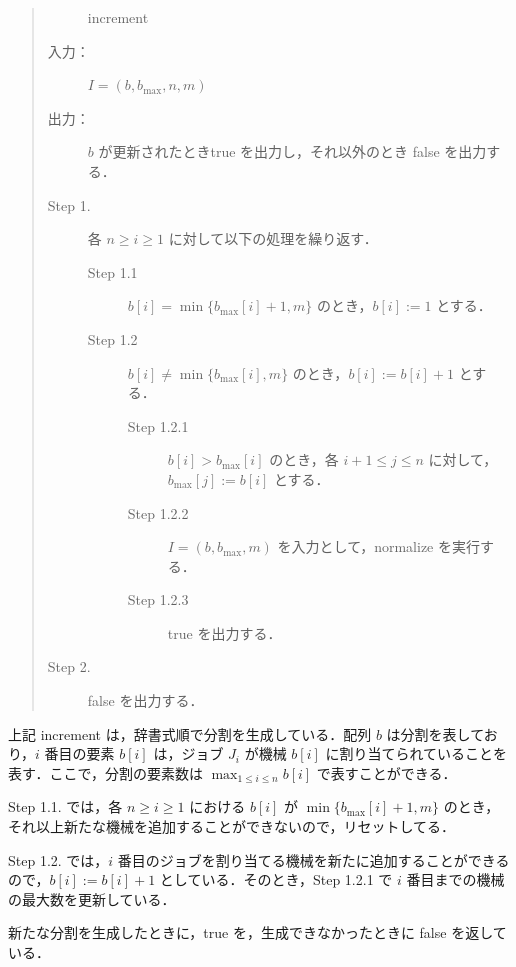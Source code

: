 \documentclass[12pt]{optlab-bachelor}
\begin{document}
\begin{quote}
  \begin{description}
    \item[]  {\sc increment}
    \item[入力：] $I = (b,b_{\max},n, m)$
    \item[出力：] $b$ が更新されたとき{\sc true} を出力し，それ以外のとき {\sc false} を出力する．
  \end{description}
  \begin{description}
    \item[Step 1.] 各 $n \ge i \ge 1$ に対して以下の処理を繰り返す．
    \begin{description}
      \item[Step 1.1] $b[i] = \min\{b_{\max}[i] + 1, m\}$ のとき，$b[i] := 1$ とする．
      \item[Step 1.2] $b[i] \neq \min\{b_{\max}[i], m\}$ のとき，$b[i] := b[i] + 1$ とする．
      \begin{description}
        \item[Step 1.2.1] $b[i] > b_{\max}[i]$ のとき，各 $i + 1 \le j \le n$ に対して，$b_{\max}[j] := b[i]$ とする．
        \item[Step 1.2.2] $I = (b,b_{\max},m)$ を入力として，{\sc normalize} を実行する．
        \item[Step 1.2.3] {\sc true} を出力する．
      \end{description}
    \end{description}
    \item[Step 2.] {\sc false} を出力する．
  \end{description}
\end{quote}

上記 {\sc increment} は，辞書式順で分割を生成している．配列 $b$ は分割を表しており，$i$ 番目の要素 $b[i]$ は，ジョブ $J_i$ が機械 $b[i]$ に割り当てられていることを表す．ここで，分割の要素数は $\displaystyle \max_{1 \le i \le n}b[i]$ で表すことができる．

Step 1.1. では，各 $n \ge i \ge 1$ における $b[i]$ が $\min\{b_{\max}[i] + 1, m\}$ のとき，それ以上新たな機械を追加することができないので，リセットしてる．

Step 1.2. では，$i$ 番目のジョブを割り当てる機械を新たに追加することができるので，$b[i] := b[i] + 1$ としている．そのとき，Step 1.2.1 で $i$ 番目までの機械の最大数を更新している．

新たな分割を生成したときに，{\sc true} を，生成できなかったときに {\sc false} を返している．
\end{document}
